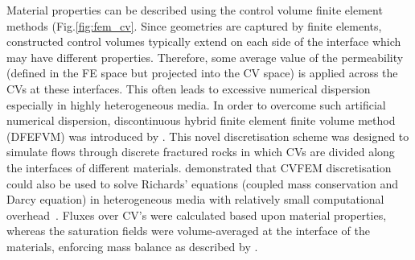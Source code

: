 \documentclass[preprint,authoryear,12pt]{elsarticle}
\begin{document}


\medskip
Material properties can be described using the control volume finite element methods (Fig.\ref{fig:fem_cv}. %
Since geometries are captured by finite elements, constructed control volumes typically extend on each side of the interface which may have different properties. Therefore, some average value of the permeability (defined in the FE space but projected into the CV space) is applied across the CVs at these interfaces. This often leads to excessive numerical dispersion especially in highly heterogeneous media. In order to overcome such artificial numerical dispersion, discontinuous hybrid finite element finite volume method (DFEFVM) was introduced by \citet{nick_2011b, nick_2011a}. This novel discretisation scheme was designed to simulate flows through discrete fractured rocks in which CVs are divided along the interfaces of different materials. \citet{cumming_2011} demonstrated that CVFEM discretisation could also be used to solve Richards' equations (coupled mass conservation and Darcy equation) in heterogeneous media with relatively small computational overhead~\citep[compared with traditional coupled velocity-pressure based formulations, see also][]{cumming_phd2012}. Fluxes over CV's were calculated based upon material properties, whereas the saturation fields were volume-averaged at the interface of the materials, enforcing mass balance as described by \citet{kirkland_1992}.
\end{document}
